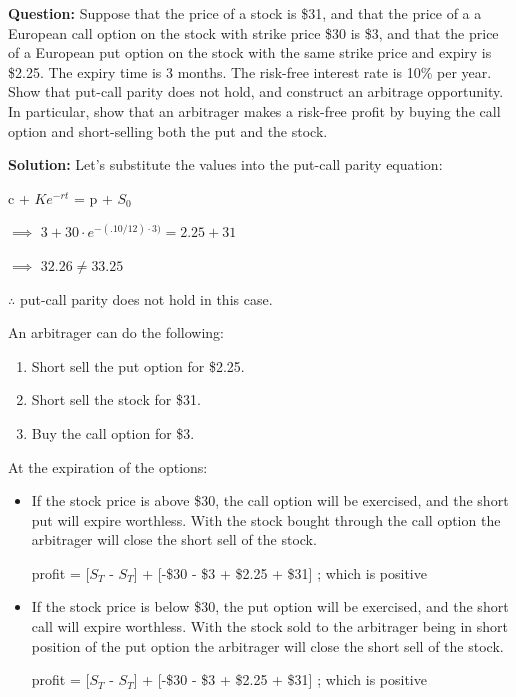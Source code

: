 \documentclass{article}
\begin{document}
\textbf{Question:} Suppose that the price of a stock is \$31, and that the price of a a European call option on the stock
with strike price \$30 is \$3, and that the price of a European put option on the stock with the same strike price
and expiry is \$2.25. The expiry time is 3 months. The risk-free interest rate is 10\% per year. Show that put-call
parity does not hold, and construct an arbitrage opportunity. In particular, show that an arbitrager makes a
risk-free profit by buying the call option and short-selling both the put and the stock.
 
\textbf{Solution:}
Let's substitute the values into the put-call parity equation:

c + $Ke^{-rt}$ = p + $S_0$

$\implies$ $3 + 30 \cdot e^{-(.10/12) \cdot 3)} = 2.25 + 31$

$\implies$ $32.26 \neq 33.25$


$\therefore$ put-call parity does not hold in this case.

\vspace{\baselineskip}
 
An arbitrager can do the following:

\begin{enumerate}
    \item Short sell the put option for \$2.25.
    \item Short sell the stock for \$31.
    \item Buy the call option for \$3.
\end{enumerate}

At the expiration of the options:
\begin{itemize}
    \item If the stock price is above \$30, the call option will be exercised, and the short put will expire worthless. With the stock bought through the call option the arbitrager will close the short sell of the stock.

    profit = [$S_T$ - $S_T$] + [-\$30 - \$3 + \$2.25 + \$31] ; which is positive 
    
    \item If the stock price is below \$30, the put option will be exercised, and the short call will expire worthless. With the stock sold to the arbitrager being in short position of the put option the arbitrager will close the short sell of the stock.

    profit = [$S_T$  - $S_T$] + [-\$30 - \$3 + \$2.25 + \$31] ; which is positive
\end{itemize}
\end{document}
